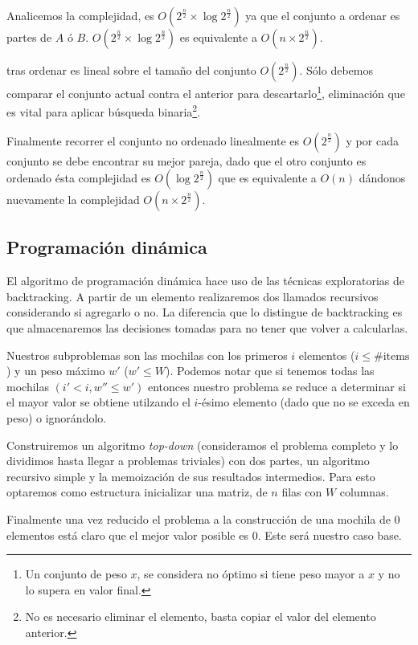 \documentclass[fleqn, 11pt]{article}
\begin{document}
Analicemos la complejidad,  es $O(2^\frac{n}{2} \times
\log2^\frac{n}{2})$ ya que el conjunto a ordenar es partes de $A$ ó $B$.
$O(2^\frac{n}{2} \times \log2^\frac{n}{2})$ es equivalente a $O(n \times
2^{\frac{n}{2}})$.

 tras ordenar es lineal sobre el tamaño del conjunto
$O(2^\frac{n}{2})$. Sólo debemos comparar el conjunto actual contra el anterior
para descartarlo\footnote{Un conjunto de peso $x$, se considera no óptimo si
tiene peso mayor a $x$ y no lo supera en valor final.}, eliminación que es
vital para aplicar búsqueda binaria\footnote{No es necesario eliminar el
elemento, basta copiar el valor del elemento anterior.}.

Finalmente recorrer el conjunto no ordenado linealmente es $O(2^\frac{n}{2})$ y
por cada conjunto se debe encontrar su mejor pareja, dado que el otro conjunto
es ordenado ésta complejidad es $O(\log{2^\frac{n}{2}})$ que es equivalente a
$O(n)$ dándonos nuevamente la complejidad $O(n \times 2^{\frac{n}{2}})$.

\subsection{Programación dinámica}

El algoritmo de programación dinámica hace uso de las técnicas exploratorias de
backtracking. A partir de un elemento realizaremos dos llamados recursivos
considerando si agregarlo o no. La diferencia que lo distingue de backtracking
es que almacenaremos las decisiones tomadas para no tener que volver a
calcularlas.

Nuestros subproblemas son las mochilas con los primeros $i$ elementos ($i \le
\#\text{items}$) y un peso máximo $w'$ ($w' \le W$). Podemos notar que si
tenemos todas las mochilas $(i' < i, w'' \le w')$ entonces nuestro problema se
reduce a determinar si el mayor valor se obtiene utilzando el $i$-ésimo
elemento (dado que no se exceda en peso) o ignorándolo.

Construiremos un algoritmo \emph{top-down} (consideramos el problema completo y
lo dividimos hasta llegar a problemas triviales) con dos partes, un algoritmo
recursivo simple y la memoización de sus resultados intermedios. Para esto
optaremos como estructura inicializar una matriz, de $n$ filas con $W$
columnas.

Finalmente una vez reducido el problema a la construcción de una mochila de $0$
elementos está claro que el mejor valor posible es $0$. Este será nuestro caso
base.
\end{document}
